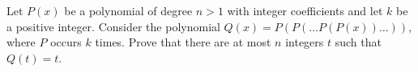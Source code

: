Let $P(x)$ be a polynomial of degree $n > 1$ with integer coefficients and let $k$ be a positive integer. Consider the polynomial $Q(x) = P(P(\ldots P(P(x)) \ldots ))$,  where $P$ occurs $k$ times. Prove that there are at most $n$ integers $t$ such that $Q(t) = t$.